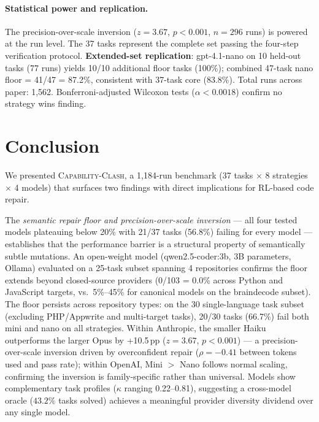 \documentclass[sigconf,review,anonymous]{acmart}
\newcommand{\ccbench}{\textsc{Capability-Clash}}
\newcommand{\pp}{\,pp}
\begin{document}
\paragraph{Statistical power and replication.}
The precision-over-scale inversion ($z=3.67$, $p<0.001$, $n=296$ runs) is powered at the run level. The 37 tasks represent the complete set passing the four-step verification protocol. \textbf{Extended-set replication}: gpt-4.1-nano on 10 held-out tasks (77 runs) yields 10/10 additional floor tasks (100\%); combined 47-task nano floor = 41/47 = 87.2\%, consistent with 37-task core (83.8\%). Total runs across paper: 1,562. Bonferroni-adjusted Wilcoxon tests ($\alpha<0.0018$) confirm no strategy wins finding.

\section{Conclusion}

We presented \ccbench{}, a 1{,}184-run benchmark (37 tasks $\times$ 8 strategies $\times$ 4 models) that surfaces two findings with direct implications for RL-based code repair.

The \emph{semantic repair floor and precision-over-scale inversion} — all four tested models plateauing below 20\% with 21/37 tasks (56.8\%) failing for every model — establishes that the performance barrier is a structural property of semantically subtle mutations. An open-weight model (qwen2.5-coder:3b, 3B parameters, Ollama) evaluated on a 25-task subset spanning 4 repositories confirms the floor extends beyond closed-source providers (0/103 = 0.0\% across Python and JavaScript targets, vs.\ 5\%--45\% for canonical models on the braindecode subset). The floor persists across repository types: on the 30 single-language task subset (excluding PHP/Appwrite and multi-target tasks), 20/30 tasks (66.7\%) fail both mini and nano on all strategies. Within Anthropic, the smaller Haiku outperforms the larger Opus by +10.5\pp{} ($z=3.67$, $p<0.001$) — a precision-over-scale inversion driven by overconfident repair ($\rho = -0.41$ between tokens used and pass rate); within OpenAI, Mini $>$ Nano follows normal scaling, confirming the inversion is family-specific rather than universal. Models show complementary task profiles ($\kappa$ ranging 0.22–0.81), suggesting a cross-model oracle ($43.2\%$ tasks solved) achieves a meaningful provider diversity dividend over any single model.
\end{document}
